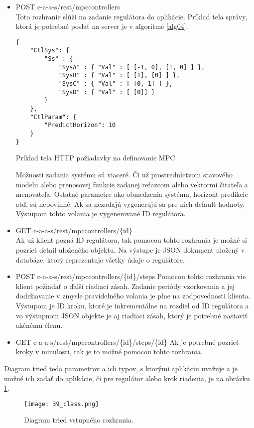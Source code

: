 \begin{itemize}
  \begin{itemize}
    \item POST c-a-a-s/rest/mpccontrollers \\
Toto rozhranie slúži na zadanie regulátora do aplikácie. Príklad tela správy, ktorá je potrebné poslať na server je v algoritme \ref{alg04}.   
\begin{algorithm}
%
\begin{lstlisting}
{
    "CtlSys": {
        "Ss" : {
            "SysA" : { "Val" : [ [-1, 0], [1, 0] ] },
            "SysB" : { "Val" : [ [1], [0] ] },
            "SysC" : { "Val" : [ [0, 1] ] },
            "SysD" : { "Val" : [ [0]] }
        }
    },
    "CtlParam": {
        "PredictHorizon": 10
    }
}
\end{lstlisting}
 \caption{Príklad tela HTTP požiadavky na definovanie MPC}
 \label{alg04}
\end{algorithm}  
Možnosti zadania systému sú viaceré. Či už prostredníctvom stavového modelu alebo prenosovej funkcie zadanej reťazcom alebo vektormi čitateľa a menovateľa. Ostatné parametre ako obmedzenia systému, horizont predikcie atď. sú nepovinné. Ak sa nezadajú vygenerujú sa pre nich default hodnoty. Výstupom tohto volania  je vygenerované ID regulátora.
    \item GET c-a-a-s/rest/mpccontrollers/\{id\} \\
Ak už klient pozná ID regulátora, tak pomocou tohto rozhrania je možné si pozrieť detail uloženého objektu. Na výstupe je JSON dokument uložený v databáze, ktorý reprezentuje všetky údaje o regulátore.
    \item POST c-a-a-s/rest/mpccontrollers/\{id\}/steps
Pomocou tohto rozhrania vie klient požiadať o ďalší riadiaci zásah. Zadanie periódy vzorkovania a jej dodržiavanie v zmysle pravidelného volania je plne na zodpovednosti klienta. Výstupom je ID kroku, ktoré je inkrementálne na rozdiel od ID regulátora a vo výstupnom JSON objekte je aj riadiaci zásah, ktorý je potrebné nastaviť akčnému členu.
    \item GET c-a-a-s/rest/mpccontrollers/\{id\}/steps/\{id\}       
Ak je potrebné pozrieť kroky v minulosti, tak je to možné pomocou  tohto rozhrania.  
  \end{itemize} 
Diagram tried teda parametrov a ich typov, s ktorými aplikáciu uvažuje a je možné ich zadať do aplikácie, či pre regulátor alebo krok riadenia, je na obrázku \ref{39_class}. 
\end{itemize} 
\begin{landscape}
\begin{figure}[h]
\centering
\texttt{[image: 39\_class.png]}
\caption{Diagram tried vstupného rozhrania.}
\label{39_class}
\end{figure} 
\end{landscape}

